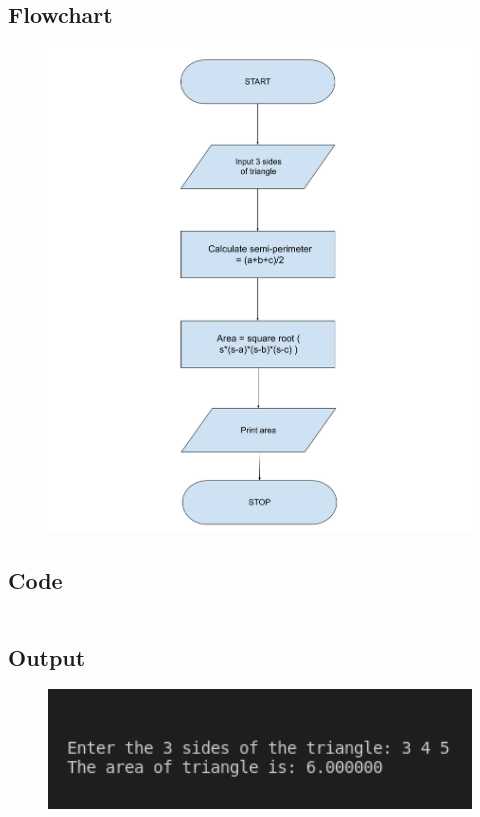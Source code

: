 \documentclass[12pt]{article}
\begin{document}
\subsection{Flowchart}
\begin{figure}[h]
    \centering
    \includegraphics[width=1.0\textwidth]{Flowchart05.png}
\end{figure}
\newpage
\subsection{Code}
\inputminted{c}{q5.c}
\subsection{Output}
\begin{figure}[h]
    \centering
    \includegraphics[width=1.0\textwidth]{5.png}
\end{figure}
\newpage
\end{document}
